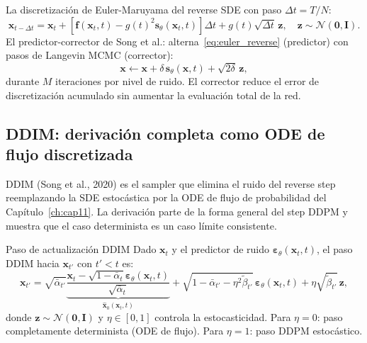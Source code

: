 La discretización de Euler-Maruyama del reverse SDE con paso $\Delta t = T/N$:
\begin{equation}
  \bm{x}_{t-\Delta t}
  = \bm{x}_t + \left[\bm{f}(\bm{x}_t,t) - g(t)^2\bm{s}_\theta(\bm{x}_t,t)\right]\Delta t
  + g(t)\sqrt{\Delta t}\,\bm{z}, \quad \bm{z}\sim\mathcal{N}(\bm{0},\bm{I}).
  \label{eq:euler_reverse}
\end{equation}
El predictor-corrector de Song et al.: alterna~\eqref{eq:euler_reverse} (predictor)
con pasos de Langevin MCMC (corrector):
\begin{equation}
  \bm{x} \leftarrow \bm{x} + \delta\,\bm{s}_\theta(\bm{x},t) + \sqrt{2\delta}\,\bm{z},
  \label{eq:langevin_corrector}
\end{equation}
durante $M$ iteraciones por nivel de ruido. El corrector reduce el error de
discretización acumulado sin aumentar la evaluación total de la red.

\subsection{DDIM: derivación completa como ODE de flujo discretizada}
\label{subsec:ddim}

DDIM (Song et al., 2020) es el sampler que elimina el ruido del reverse step
reemplazando la SDE estocástica por la ODE de flujo de probabilidad del
Capítulo~\ref{ch:cap11}. La derivación parte de la forma general del step DDPM y muestra
que el caso determinista es un caso límite consistente.

\begin{teorema}{Paso de actualización DDIM}
\label{thm:ddim}
Dado $\bm{x}_t$ y el predictor de ruido $\bm{\varepsilon}_\theta(\bm{x}_t,t)$,
el paso DDIM hacia $\bm{x}_{t'}$ con $t' < t$ es:
\begin{equation}
  \bm{x}_{t'}
  = \sqrt{\bar{\alpha}_{t'}}\underbrace{\frac{\bm{x}_t - \sqrt{1-\bar{\alpha}_t}
  \bm{\varepsilon}_\theta(\bm{x}_t,t)}{\sqrt{\bar{\alpha}_t}}}_{\hat{\bm{x}}_0(\bm{x}_t,t)}
  + \sqrt{1-\bar{\alpha}_{t'} - \eta^2\tilde{\beta}_{t'}}\,
  \bm{\varepsilon}_\theta(\bm{x}_t,t)
  + \eta\sqrt{\tilde{\beta}_{t'}}\,\bm{z},
  \label{eq:ddim_step}
\end{equation}
donde $\bm{z}\sim\mathcal{N}(\bm{0},\bm{I})$ y $\eta\in[0,1]$ controla la
estocasticidad. Para $\eta=0$: paso completamente determinista (ODE de flujo).
Para $\eta=1$: paso DDPM estocástico.
\end{teorema}

